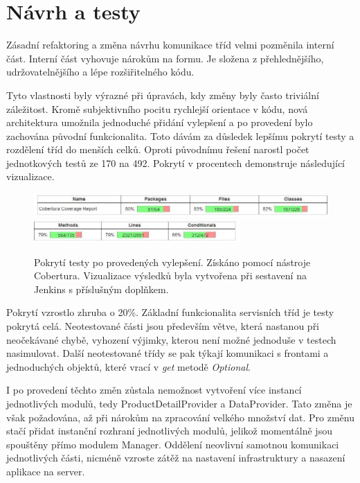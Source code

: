 \documentclass[thesis=B,czech]{FITthesis}[2012/06/26]
\begin{document}
\section{Návrh a testy}
Zásadní refaktoring a změna návrhu komunikace tříd velmi pozměnila interní část. 
Interní část vyhovuje nárokům na formu. Je složena z přehlednějšího, udržovatelnějšího a
lépe rozšiřitelného kódu.
\par
Tyto vlastnosti byly výrazné při úpravách, kdy změny byly často triviální záležitost.
Kromě subjektivního pocitu rychlejší orientace v kódu, nová architektura umožnila jednoduché přidání vylepšení
a po provedení bylo zachována původní funkcionalita. Toto dávám za důsledek lepšímu pokrytí
testy a rozdělení tříd do menších celků. Oproti původnímu řešení narostl počet jednotkových
testů ze 170 na 492. Pokrytí v procentech demonstruje následující vizualizace.

\begin{figure}[h]\centering
 	\includegraphics[width=1.0\textwidth]{resources/cobertura-report-new-1}
 	\includegraphics[width=0.7\textwidth]{resources/cobertura-report-new-2}
	\caption[Pokrytí testy po provedených vylepšení]{Pokrytí testy po provedených vylepšení. Získáno pomocí nástroje Cobertura. Vizualizace
	výsledků byla vytvořena při sestavení na Jenkins s příslušným doplňkem.}\label{fig:cober-new}
\end{figure}

Pokrytí vzrostlo zhruba o 20\%. Základní funkcionalita servisních tříd je testy pokrytá celá.
Neotestované části jsou především větve, která nastanou při neočekávané chybě, vyhození výjimky, kterou není možné jednoduše v testech nasimulovat.
Další neotestované třídy se pak týkají komunikaci s frontami a jednoduchých objektů, které vrací v \textit{get} metodě \textit{Optional}.

\par
I po provedení těchto změn zůstala nemožnost vytvoření více instancí jednotlivých modulů, tedy ProductDetailProvider a DataProvider.
Tato změna je však požadována, až při nárokům na zpracování velkého množství dat. Pro změnu stačí přidat instanční rozhraní jednotlivých modulů, jelikož momentálně jsou spouštěny přímo modulem Manager. Oddělení neovlivní samotnou komunikaci jednotlivých části, nicméně 
vzroste zátěž na nastavení infrastruktury a nasazení aplikace na server.
\end{document}

